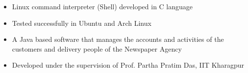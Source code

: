 \documentclass[10pt,a4paper]{moderncv}
\begin{document}

{\begin{itemize}
\item {\normalsize Linux command interpreter (Shell) developed in C language }
\item {\normalsize Tested successfully in Ubuntu and Arch Linux }   
\end{itemize}}

{\begin{itemize}
\item {\normalsize A Java based software that manages the accounts and activities of the customers and delivery people of the Newspaper Agency }
\item {\normalsize Developed under the supervision of Prof. Partha Pratim Das, IIT Kharagpur } 
\end{itemize}}



\end{document}

